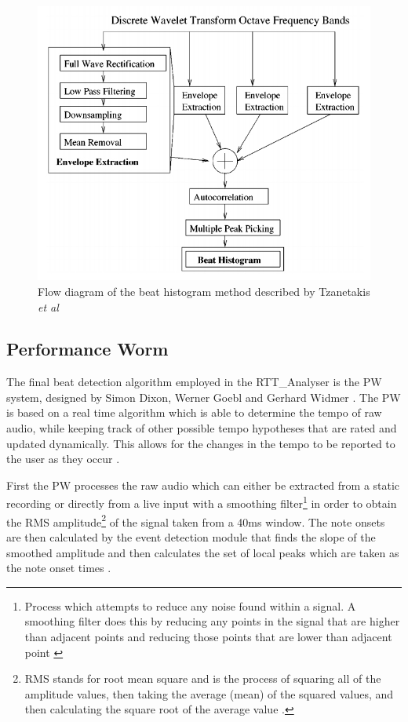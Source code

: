 \documentclass[a4paper, 11pt]{article}
\begin{document}
\begin{figure}[h]
	\centering
	\includegraphics[scale=0.35]{images/dwtflow.jpg}
	\caption{Flow diagram of the beat histogram method described by Tzanetakis \textit{et al} \cite{tzane3}}
	\label{fig: dwtFlow}
\end{figure}


\subsection{Performance Worm}
The final beat detection algorithm employed in the RTT\_Analyser is the PW system, designed by Simon Dixon, Werner Goebl and Gerhard Widmer \cite{dixonGoeblWidmer}. The PW is based on a real time algorithm which is able to determine the tempo of raw audio, while keeping track of other possible tempo hypotheses that are rated and updated dynamically. This allows for the changes in the tempo to be reported to the user as they occur \cite{dixonGoeblWidmer}. 

First the PW processes the raw audio which can either be extracted from a static recording or directly from a live input with a smoothing filter\footnote{Process which attempts to reduce any noise found within a signal. A smoothing filter does this by reducing any points in the signal that are higher than adjacent points and reducing those points that are lower than adjacent point \cite{pragmaticSig}} in order to obtain the RMS amplitude\footnote{RMS stands for root mean square and is the process of squaring all of the amplitude values, then taking the average (mean) of the squared values, and then calculating the square root of the average value \cite{rms}.} of the signal taken from a 40ms window. The note onsets are then calculated by the event detection module that finds the slope of the smoothed amplitude and then calculates the set of local peaks which are taken as the note onset times \cite{dixonGoeblWidmer}. 
\end{document}
